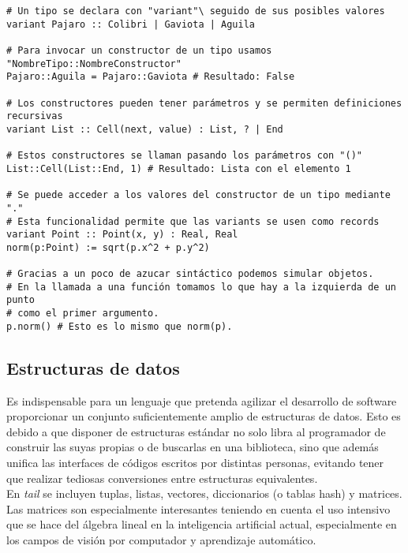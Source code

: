 \begin{lstlisting}[style=tail, label={lst:tipos}, caption={Declaración de tipos}]
# Un tipo se declara con "variant"\ seguido de sus posibles valores
variant Pajaro :: Colibri | Gaviota | Aguila

# Para invocar un constructor de un tipo usamos "NombreTipo::NombreConstructor"
Pajaro::Aguila = Pajaro::Gaviota # Resultado: False

# Los constructores pueden tener parámetros y se permiten definiciones recursivas
variant List :: Cell(next, value) : List, ? | End

# Estos constructores se llaman pasando los parámetros con "()"
List::Cell(List::End, 1) # Resultado: Lista con el elemento 1

# Se puede acceder a los valores del constructor de un tipo mediante "."
# Esta funcionalidad permite que las variants se usen como records
variant Point :: Point(x, y) : Real, Real
norm(p:Point) := sqrt(p.x^2 + p.y^2)

# Gracias a un poco de azucar sintáctico podemos simular objetos.
# En la llamada a una función tomamos lo que hay a la izquierda de un punto
# como el primer argumento.
p.norm() # Esto es lo mismo que norm(p).
\end{lstlisting}

\subsection{Estructuras de datos}

Es indispensable para un lenguaje que pretenda agilizar el desarrollo de software proporcionar un conjunto suficientemente amplio de estructuras de datos. Esto es debido a que disponer de estructuras estándar no solo libra al programador de construir las suyas propias o de buscarlas en una biblioteca, sino que además unifica las interfaces de códigos escritos por distintas personas, evitando tener que realizar tediosas conversiones entre estructuras equivalentes.\\

En \textit{tail} se incluyen tuplas, listas, vectores, diccionarios (o tablas hash) y matrices. Las matrices son especialmente interesantes teniendo en cuenta el uso intensivo que se hace del álgebra lineal en la inteligencia artificial actual, especialmente en los campos de visión por computador y aprendizaje automático.

